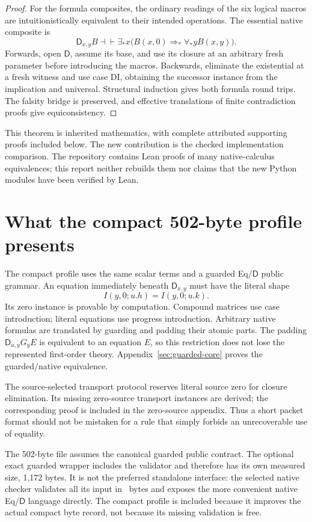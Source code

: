 \documentclass[11pt]{article}
\theoremstyle{definition}\newtheorem{definition}[theorem]{Definition}
\theoremstyle{remark}\newtheorem{remark}[theorem]{Remark}
\newcommand{\D}{\mathsf D}
\begin{document}
\begin{proof}
For the formula composites, the ordinary readings of the six logical
macros are intuitionistically equivalent to their intended operations.
The essential native composite is
\[
 \D_{x,y}B\dashv\vdash
 \exists_*x\bigl(B(x,0)\Rightarrow_*\forall_*y B(x,y)\bigr).
\]
Forwards, open \(\D\), assume its base, and use its closure at an arbitrary
fresh parameter before introducing the macros. Backwards, eliminate the
existential at a fresh witness and use case DI, obtaining the successor
instance from the implication and universal. Structural induction gives
both formula round trips. The falsity bridge is preserved, and effective
translations of finite contradiction proofs give equiconsistency.
\end{proof}

This theorem is inherited mathematics, with complete attributed supporting
proofs included below. The new contribution is the checked implementation
comparison. The repository contains Lean proofs of many native-calculus
equivalences; this report neither rebuilds them nor claims that the new
Python modules have been verified by Lean.

\section{What the compact 502-byte profile presents}
\label{main:compact}

The compact profile uses the same scalar terms and a guarded Eq/\(\D\)
public grammar. An equation immediately beneath \(\D_{x,y}\) must have
the literal shape
\[
              I(y,0;u.h)=I(y,0;u.k).
\]
Its zero instance is provable by computation. Compound matrices use case
introduction; literal equations use progress introduction. Arbitrary native
formulas are translated by guarding and padding their atomic parts. The
padding \(\D_{u,y}G_yE\) is equivalent to an equation \(E\), so this
restriction does not lose the represented first-order theory.
Appendix~\ref{sec:guarded-core} proves the guarded/native equivalence.

The source-selected transport protocol reserves literal source zero for
closure elimination. Its missing zero-source transport instances are
derived; the corresponding proof is included in the zero-source appendix.
Thus a short packet format should not be mistaken for a rule that simply
forbids an unrecoverable use of equality.

The 502-byte file assumes the canonical guarded public contract. The
optional exact guarded wrapper includes the validator and therefore has
its own measured size, 1,172 bytes. It is not the preferred standalone
interface: the selected native checker validates all its input in
\NativeBytes\ bytes and exposes the more convenient native Eq/\(\D\)
language directly. The compact profile is included because it improves
the actual compact byte record, not because its missing validation is
free.
\end{document}
